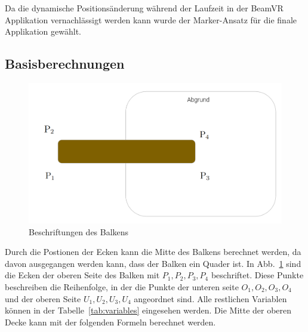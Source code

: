 Da die dynamische Positionsänderung während der Laufzeit in der BeamVR Applikation vernachlässigt werden kann wurde der Marker-Ansatz für die finale Applikation gewählt.

\subsection{Basisberechnungen}
\label{subsec:basisberechnungen}

\begin{figure}
    \centering
    \includegraphics[scale=0.25]{pics/beam-point-labeling}
    \caption{Beschriftungen des Balkens}
    \label{fig:beam-point-labeling}
\end{figure}


Durch die Postionen der Ecken kann die Mitte des Balkens berechnet werden, da davon ausgegangen werden kann, dass der Balken ein Quader ist.
In Abb.~\ref{fig:beam-point-labeling} sind die Ecken der oberen Seite des Balken mit $P_{1}, P_{2}, P_{3}, P_{4}$ beschriftet.
Diese Punkte beschreiben die Reihenfolge, in der die Punkte der unteren seite $O_{1}, O_{2}, O_{3}, O_{4}$ und der oberen Seite $U_{1}, U_{2}, U_{3}, U_{4}$ angeordnet sind.
Alle restlichen Variablen können in der Tabelle~\ref{tab:variables} eingesehen werden.
Die Mitte der oberen Decke kann mit der folgenden Formeln berechnet werden.


